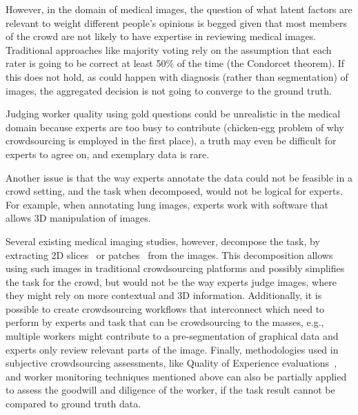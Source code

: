 \documentclass[10pt,twocolumn,letterpaper]{article}
\begin{document}
 However, in the domain of medical images, the question of what latent factors are relevant to weight different people's opinions is begged given that most members of the crowd are not likely to have expertise in reviewing medical images. Traditional approaches like majority voting rely on the assumption that each rater is going to be correct at least 50\% of the time (the Condorcet theorem). If this does not hold, as could happen with diagnosis (rather than segmentation) of images, the aggregated decision is not going to converge to the ground truth.

  Judging worker quality using gold questions could be unrealistic in the medical domain because experts are too busy to contribute (chicken-egg problem of why crowdsourcing is employed in the first place), a truth may even be difficult for experts to agree on, and exemplary data is rare.  
  
  Another issue is that the way experts annotate the data could not be feasible in a crowd setting, and the task when decomposed, would not be logical for experts. For example, when annotating lung images, experts work with software that allows 3D manipulation of images.
  
  
Several existing medical imaging studies, however, decompose the task, by extracting 2D slices~\cite{oneil2017crowdsourcing,orting2017crowdsourced} or patches~\cite{cheplygina2016early} from the images. This decomposition allows using such images in traditional crowdsourcing platforms and possibly simplifies the task for the crowd, but would not be the way experts judge images, where they might rely on more contextual and 3D information.
Additionally, it is possible to create crowdsourcing workflows that interconnect which need to perform by experts and task that can be crowdsourcing to the masses, e.g., multiple workers might contribute to a pre-segmentation of graphical data and experts only review relevant parts of the image.
Finally, methodologies used in subjective crowdsourcing assessments, like Quality of Experience evaluations~\cite{hossfeld2014best}, and worker monitoring techniques mentioned above can also be partially applied to assess the goodwill and diligence of the worker, if the task result cannot be compared to ground truth data.  

    

\end{document}
